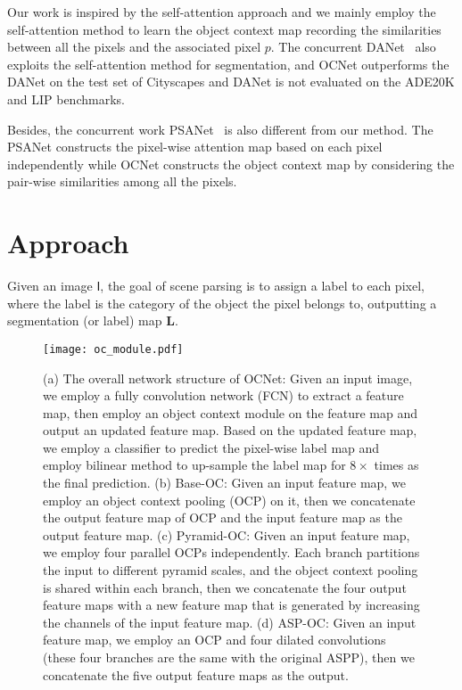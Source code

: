 \documentclass[10pt,twocolumn,letterpaper]{article}
\begin{document}
Our work is inspired by the self-attention approach and we mainly employ the self-attention method to learn the object context map recording the similarities between all the pixels and the associated pixel $p$.
The concurrent DANet~\cite{fu2018dual} also exploits the self-attention method for segmentation, and OCNet outperforms the DANet on the
test set of Cityscapes and DANet is not evaluated on the ADE20K and LIP benchmarks.

Besides, the concurrent work PSANet~\cite{psanet} is also different from our method. The PSANet constructs the pixel-wise attention map based on each pixel independently while OCNet constructs the object context map by considering the pair-wise similarities among all the pixels.

\section{Approach}
Given an image $\mathsf{I}$,
the goal of scene parsing is to 
assign a label to each pixel,
where the label is the category
of the object the pixel belongs to,
outputting a segmentation (or label) map $\mathbf{L}$.

\begin{figure*}[t]
\hspace{-0.5cm}
\texttt{[image: oc\_module.pdf]}
\caption{\small{
(a) The overall network structure of OCNet: Given an input image, we employ a fully convolution network (FCN) to extract a feature map, then employ an object context module on the feature map and output an updated feature map. Based on the updated feature map, we employ a classifier to predict the pixel-wise label map and employ bilinear method to up-sample the label map for $8 \times$ times as the final prediction.
(b) Base-OC: Given an input feature map, we employ an object context pooling (OCP) on it, then we concatenate the output feature map of OCP and the input feature map as the output feature map.
(c) Pyramid-OC: Given an input feature map, we employ four parallel OCPs independently. Each branch partitions the input to different pyramid scales, and the object context pooling is shared within each branch, then we concatenate the four output feature maps with a new feature map that is generated by increasing the channels of the input feature map.
(d) ASP-OC: Given an input feature map, we employ an OCP and four dilated convolutions (these four branches are the same with the original ASPP), then we concatenate the five output feature maps as the output.}}
\label{fig:OCNet_pipeline}
\end{figure*}
\end{document}
